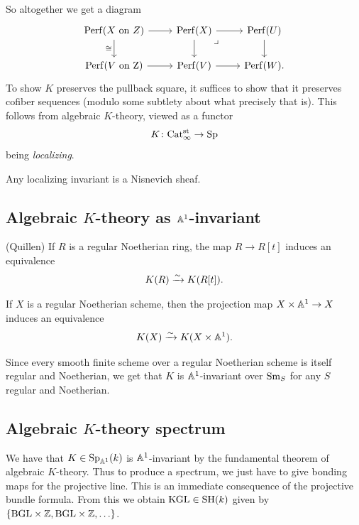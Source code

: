 \documentclass[11pt,openany]{book}
\begin{document}
So altogether we get a diagram
\[ \begin{tikzcd}
    \Perf(X\text{ on }Z)\rar\dar["\cong" left] & \Perf(X)\rar\dar\pb & \Perf(U)\dar\\
    \Perf(V\text{ on Z})\rar & \Perf(V)\rar & \Perf(W).
\end{tikzcd} \]
To show $K$ preserves the pullback square, it suffices to show that it preserves cofiber sequences (modulo some subtlety about what precisely that is). This follows from algebraic $K$-theory, viewed as a functor
\begin{align*}
    K \colon \mathrm{Cat}_\infty^{\mathrm{st}} \to \mathrm{Sp}
\end{align*}
being \textit{localizing}.

\begin{corollary} Any localizing invariant is a Nisnevich sheaf.
\end{corollary}

\subsection{Algebraic $K$-theory as $\mathbb{A}^1$-invariant}

\begin{theorem} \cite[p.~38]{Quillen-K1} (Quillen) If $R$ is a regular Noetherian ring, the map $R \to R[t]$ induces an equivalence
\begin{align*}
    K(R) \xrightarrow{\sim} K(R[t]).
\end{align*}
\end{theorem}

\begin{theorem} \cite[6.8]{TT} If $X$ is a regular Noetherian scheme, then the projection map $X \times \mathbb{A}^1 \to X$ induces an equivalence
\begin{align*}
    K(X) \xrightarrow{\sim} K(X \times \mathbb{A}^1).
\end{align*}
\end{theorem}

Since every smooth finite scheme over a regular Noetherian scheme is itself regular and Noetherian, we get that $K$ is $\mathbb{A}^1$-invariant over $\mathrm{Sm}_S$ for any $S$ regular and Noetherian.

\subsection{Algebraic $K$-theory spectrum}


We have that $K \in \mathrm{Sp}_{\mathbb{A}^1}(k)$ is $\mathbb{A}^1$-invariant by the fundamental theorem of algebraic $K$-theory. Thus to produce a spectrum, we just have to give bonding maps for the projective line. This is an immediate consequence of the projective bundle formula. From this we obtain $\mathrm{KGL} \in \mathrm{SH}(k)$ given by $\left\{ \mathrm{BGL} \times \mathbb{Z}, \mathrm{BGL} \times \mathbb{Z}, \ldots \right\}$.
\end{document}
